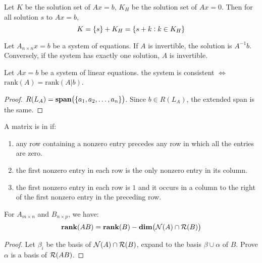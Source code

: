 \begin{theorem}\label{equationfromoneandnullspace}
	Let $K$ be the solution set of $Ax=b$, $K_H$ be the solution set of $Ax=0$. Then for all solution $s$ to $Ax=b$,
	\begin{equation}
		K = \set{s} + K_H = \set{s+k: k \in K_H }
	\end{equation}
\end{theorem}


\begin{theorem}
	Let $A_{n \times n}x=b$ be a system of equations. If $A$ is invertible, the solution is $A^{-1}b$. Conversely, if the system has exactly one solution, $A$ is invertible.
\end{theorem}



\begin{theorem}
	Let $Ax=b$ be a system of linear equations. the system is consistent $\Leftrightarrow$ $\text{rank}(A) = \text{rank}(A|b)$.
\end{theorem}

\begin{proof}
    $R(L_A) = \vectorspan{\set{a_1, a_2, \dots, a_n }}$. Since $b \in R(L_A)$, the extended span is the same.
\end{proof}


\begin{definition}
	A matrix is in  if:
	\begin{enumerate}
		\item any row containing a nonzero entry precedes any row in which all the entries are zero.
		\item the first nonzero entry in each row is the only nonzero entry in its column.
		\item the first nonzero entry in each row is $1$ and it occurs in a column to the right of the first nonzero entry in the preceding row.
	\end{enumerate}
\end{definition}

\begin{theorem}\label{rankoftwomatrix}
    For $A_{m \times n}$ and $B_{n \times p}$, we have:
    \begin{equation}
        \rank{AB} = \rank{B} - \dimension{\nullspace{A} \cap \rangespace{B}}
    \end{equation}
\end{theorem}
\begin{proof}
    Let $\beta_i$ be the basis of $\mathcal{N}(A) \cap \mathcal{R}(B)$, expand to the basis $\beta \cup \alpha$ of $B$. Prove $\alpha$ is a basis of $\mathcal{R}(AB)$.
\end{proof}

